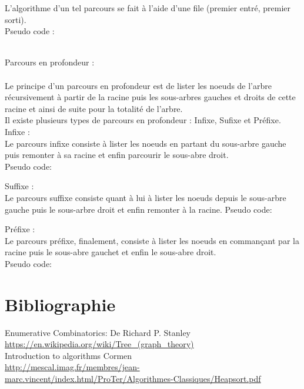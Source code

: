 \documentclass{report}
\begin{document}
L'algorithme d'un tel parcours se fait à l'aide d'une file (premier entré, premier sorti).\\
Pseudo code : \\
\begin{comment}
def parcours_largueur(arbre):
	si arbre vide :
	retourner liste vide
	sinon:
	retouner [  racine(arbre) + racine(sous-arbre gauche) + racine(sous-arbre droit)  ]
\end{comment}
~\\
Parcours en profondeur :\\
~\\
Le principe d'un parcours en profondeur est de lister les noeuds de l'arbre récursivement à partir de la racine puis les sous-arbres gauches et droits de cette racine et ainsi de suite pour la totalité de l'arbre.\\
Il existe plusieurs types de parcours en profondeur : Infixe, Sufixe et Préfixe.\\
Infixe : \\
Le parcours infixe consiste à lister les noeuds en partant du sous-arbre gauche puis remonter à sa racine et enfin parcourir le sous-abre droit.\\
Pseudo code:\\
\begin{comment}
def parcours_infixe(arbre):
	si arbre vide :
	retourner liste vide
	sinon:
	retourner [  parcours_infixe(sous-arbre gauche) + racine(arbre) + parcours_infixe(sous-arbre droit)  ]
\end{comment}
Suffixe :\\
Le parcours suffixe consiste quant à lui à lister les noeuds depuis le sous-arbre gauche puis le sous-arbre droit et enfin remonter à la racine.
Pseudo code:\\
\begin{comment}
def parcours_suffixe(arbre):
	si arbre vide :
	retourner liste vide
	sinon:
	retouner [ parcours_suffixe(sous-arbre gauche) +  parcours_suffixe(sous-arbre droit) + racine(arbre)  ]
\end{comment}
Préfixe : \\
Le parcours préfixe, finalement, consiste à lister les noeuds en commançant par la racine puis le sous-abre gauchet et enfin le sous-abre droit.\\
Pseudo code:\\
\begin{comment}
def parcours_prefixe(arbre):
	si arbre vide :
	retourner liste vide
	sinon:
	retouner [ racine(arbre) + parcours_prefixe(sous-arbre gauche) +  parcours_prefixe(sous-arbre droit)  ]
\end{comment}



\section{Bibliographie}


Enumerative Combinatorics: De Richard P. Stanley \\
\url{https://en.wikipedia.org/wiki/Tree_(graph_theory)}\\
Introduction to algorithms Cormen\\
\url{http://mescal.imag.fr/membres/jean-marc.vincent/index.html/ProTer/Algorithmes-Classiques/Heapsort.pdf}\\

\listoffigures
\end{document}
